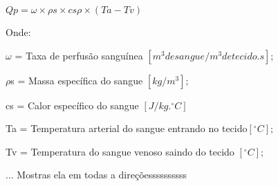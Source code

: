 $
     Qp = \omega\times\rho s\times cs\rho\times(Ta-Tv) $

       Onde:

       $\omega$ = Taxa de perfusão sanguínea $[m^3 de sangue/m^3 de tecido.s];$

      $ \rho$s = Massa específica do sangue $[kg/m^3];$

        cs = Calor específico do sangue  $[J/kg.^{\circ}C]$

        Ta = Temperatura arterial do sangue entrando no tecido$ [^{\circ}C];$

      Tv = Temperatura do sangue venoso saindo do tecido $[^{\circ}C];$


... Mostras ela em todas a direçõessssssssss






           
              